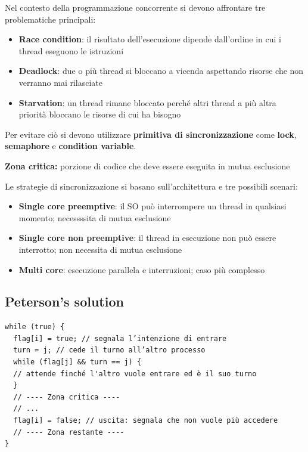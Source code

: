 Nel contesto della programmazione concorrente si devono affrontare tre problematiche principali:

\begin{itemize}
  \item \textbf{Race condition}: il risultato dell'esecuzione dipende dall'ordine in cui i thread eseguono le istruzioni
  \item \textbf{Deadlock}: due o più thread si bloccano a vicenda aspettando risorse che non verranno mai rilasciate
  \item \textbf{Starvation}: un thread rimane bloccato perché altri thread a più altra priorità bloccano le risorse di cui ha bisogno
\end{itemize}

Per evitare ciò si devono utilizzare \textbf{primitiva di sincronizzazione} come \textbf{lock}, \textbf{semaphore} e \textbf{condition variable}.

\begin{tcolorbox}
  \textbf{Zona critica:} porzione di codice che deve essere eseguita in mutua esclusione
\end{tcolorbox}

Le strategie di sincronizzazione si basano sull'architettura e tre possibili scenari:

\begin{itemize}
  \item \textbf{Single core preemptive}: il SO può interrompere un thread in qualsiasi momento; necessssita di mutua esclusione
  \item \textbf{Single core non preemptive}: il thread in esecuzione non può essere interrotto; non necessita di mutua esclusione
  \item \textbf{Multi core}: esecuzione parallela e interruzioni; caso più complesso
\end{itemize}

\subsection{Peterson's solution}

\begin{verbatim}
while (true) {
  flag[i] = true; // segnala l’intenzione di entrare
  turn = j; // cede il turno all’altro processo
  while (flag[j] && turn == j) {
  // attende finché l'altro vuole entrare ed è il suo turno
  }
  // ---- Zona critica ----
  // ...
  flag[i] = false; // uscita: segnala che non vuole più accedere
  // ---- Zona restante ----
}
\end{verbatim}

